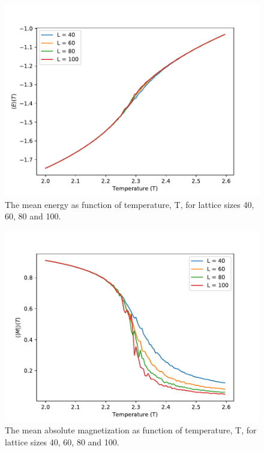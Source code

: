 \documentclass[12pt,english,a4paper]{article}
\begin{document}
\begin{figure}[H]
    \centering
    \includegraphics[scale=0.7]{Figures/E_of_T_N_1000000000.pdf}
    \caption{The mean energy as function of temperature, T, for lattice sizes 40, 60, 80 and 100.}
    \label{fig:E_of_T}
\end{figure}
\begin{figure}[H]
    \centering
    \includegraphics[scale=0.7]{Figures/M_of_T_N_1000000000.pdf}
    \caption{The mean absolute magnetization as function of temperature, T, for lattice sizes 40, 60, 80 and 100.}
    \label{fig:M_of_T}
\end{figure}
\end{document}
